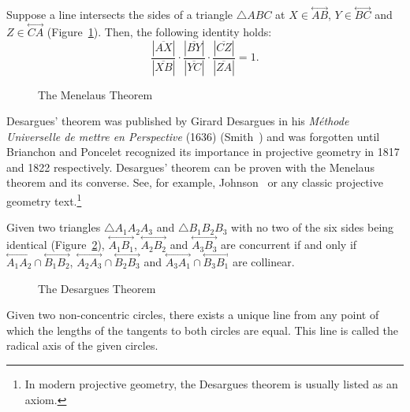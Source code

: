 \begin{theorem}[Menelaus]
\label{thm:menelaus}
     Suppose a line intersects the sides of a triangle $\bigtriangleup ABC$ at
$X\in\stackrel{\longleftrightarrow}{AB}$,
$Y\in\stackrel{\longleftrightarrow}{BC}$ and
$Z\in\stackrel{\longleftrightarrow}{CA}$ (Figure~\ref{fig:menelaus}).
Then, the following identity holds:
\[ \frac{|\overline{AX}|}{|\overline{XB}|}\cdot
     \frac{|\overline{BY}|}{|\overline{YC}|}\cdot
     \frac{|\overline{CZ}|}{|\overline{ZA}|} = 1. \]
\end{theorem}
\begin{figure}
\vspace{4cm}
\caption{The Menelaus Theorem}
\label{fig:menelaus}
\end{figure}

     Desargues' theorem was published by Girard Desargues 
in his {\em M\'{e}thode Universelle de mettre en Perspective} (1636) 
(Smith~\cite{smith:1959}) and was forgotten until Brianchon 
and Poncelet  recognized its importance in projective geometry
in 1817 and 1822 respectively.  Desargues' theorem can be proven with the
Menelaus theorem and its converse. See, for example, 
Johnson~\cite{johnson:1929} or any
classic projective geometry text.\footnote{In modern projective geometry,
the Desargues theorem is usually listed as an axiom.}

\begin{theorem}
\label{thm:desargues}
     Given two triangles $\bigtriangleup A_1A_2A_3$ and 
$\bigtriangleup B_1B_2B_3$ with no two of the six sides being identical 
(Figure~\ref{fig:desargues}),
$\stackrel{\longleftrightarrow}{A_1B_1}$,
$\stackrel{\longleftrightarrow}{A_2B_2}$ and
$\stackrel{\longleftrightarrow}{A_3B_3}$ are concurrent if and only if
$\stackrel{\longleftrightarrow}{A_1A_2}\cap\stackrel{\longleftrightarrow}{B_1B_2}$,
$\stackrel{\longleftrightarrow}{A_2A_3}\cap\stackrel{\longleftrightarrow}{B_2B_3}$ and
$\stackrel{\longleftrightarrow}{A_3A_1}\cap\stackrel{\longleftrightarrow}{B_3B_1}$
are collinear.
\end{theorem}
\begin{figure}
\vspace{6cm}
\caption{The Desargues Theorem}
\label{fig:desargues}
\end{figure}

\begin{definition}
     Given two non-concentric circles, there exists a unique line from any
point of which the lengths of the tangents to both circles are equal.  
This line is called the radical axis of the given circles.  
\end{definition}

